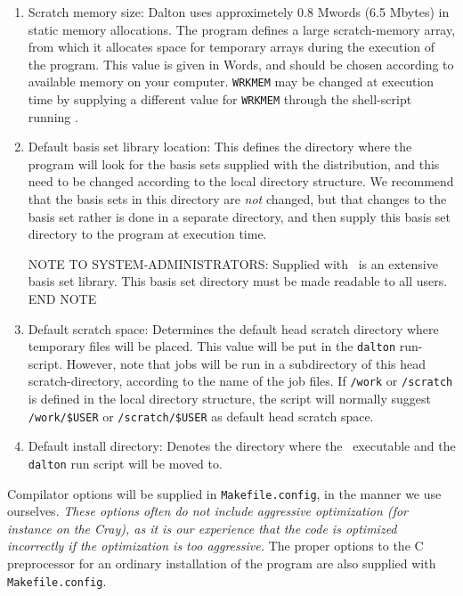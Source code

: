 \begin{enumerate}
\item Scratch memory size: Dalton uses
approximetely 0.8 Mwords (6.5 Mbytes)
in static memory allocations. The program defines a large scratch-memory
array, from which it allocates space for temporary arrays
during the execution of the program. This value is given in Words, and
should be chosen according to available memory on your computer.
\verb|WRKMEM| may be changed at execution time by supplying a
different value for \verb|WRKMEM| through the shell-script running
\dalton .

\item Default basis set library location:
This defines the directory where the program will look for the
basis sets supplied with the distribution, and this need to be
changed according to the local directory structure. We recommend
that the basis sets in this directory are {\em not} changed, but
that changes to the basis set rather is done in a separate
directory, and then supply this basis set directory to the program
at execution time.

{\sc NOTE TO SYSTEM-ADMINISTRATORS:} Supplied with \dalton\ is an
extensive basis set library. This basis set directory must be made
readable to all users. {\sc END NOTE}

\item Default scratch space: Determines the
default head scratch
directory where temporary files will be placed. This value will be put
in the \verb|dalton| run-script. However, note that jobs will be run in
a subdirectory of this head scratch-directory, according to the name
of the job files. If \verb|/work| or \verb|/scratch| is defined in the
local directory structure, the script will normally suggest
\verb|/work/$USER| or  \verb|/scratch/$USER| as default head scratch space.

\item Default install directory: Denotes the directory where the \dalton\
executable and the \verb|dalton| run script will be moved to.
\end{enumerate}

Compilator options will be supplied in \verb|Makefile.config|, in the manner
we use ourselves. {\em These options often do not include aggressive
optimization\index{optimization (f77)} (for instance on the Cray), as
it is our experience that
the code is optimized incorrectly if the optimization is too
aggressive.} The proper options to the C preprocessor for an ordinary
installation of the program are also supplied with \verb|Makefile.config|.

